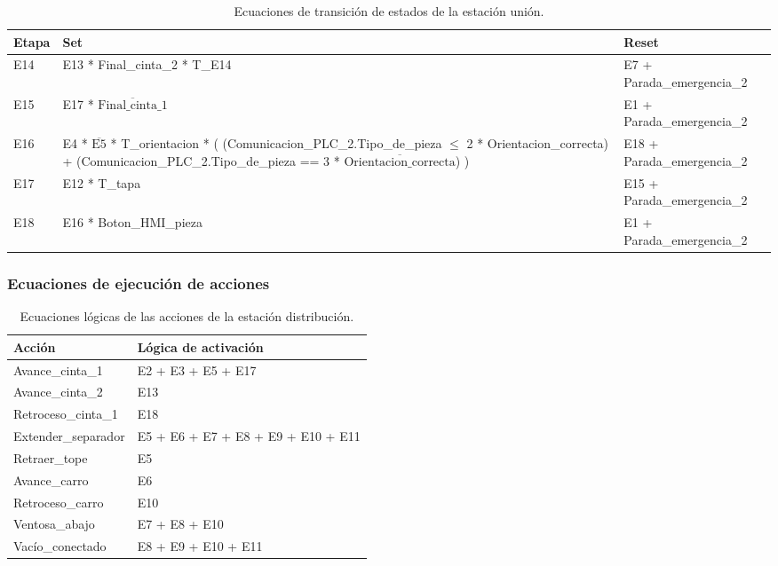 \begin{table}[H]
\begin{center}

\renewcommand{\arraystretch}{1.5}
\begin{tabular}{|M{1.5cm}|M{6cm}|M{6cm}|}
\hline
\textbf{Etapa} & 
\textbf{Set} & 
\textbf{Reset} \\
\hline
E14  &  E13 *  Final\_cinta\_2 * T\_E14 & E7 + Parada\_emergencia\_2 \\
\hline
E15  &  E17 * $\overline{\text{Final\_cinta\_1}}$ & E1 + Parada\_emergencia\_2 \\
\hline
E16  &  E4 * $\overline{\text{E5}}$ * T\_orientacion * ( (Comunicacion\_PLC\_2.Tipo\_de\_pieza $\leq$ 2 * Orientacion\_correcta) + (Comunicacion\_PLC\_2.Tipo\_de\_pieza == 3 * $\overline{\text{Orientacion\_correcta}}$) ) & E18 + Parada\_emergencia\_2 \\
\hline
E17  &  E12 * T\_tapa & E15 + Parada\_emergencia\_2 \\
\hline
E18  &  E16 *  Boton\_HMI\_pieza & E1 + Parada\_emergencia\_2 \\
\hline

\end{tabular}

\caption{Ecuaciones de transición de estados de la estación unión.}
\label{cuadro:transiciones_union_2}
\end{center}
\end{table}

\subsubsection{Ecuaciones de ejecución de acciones}

\begin{table}[H]
\begin{center}

\renewcommand{\arraystretch}{1.5}
\begin{tabular}{|M{5cm}|M{8.5cm}|}
\hline
\textbf{Acción} & 
\textbf{Lógica de activación} \\ 
\hline
Avance\_cinta\_1 &  E2 + E3 + E5 + E17 \\
\hline
Avance\_cinta\_2 &  E13 \\
\hline
Retroceso\_cinta\_1 & E18 \\
\hline
Extender\_separador &  E5 + E6 + E7 + E8 + E9 + E10 + E11 \\
\hline
Retraer\_tope &  E5 \\
\hline
Avance\_carro &  E6 \\
\hline
Retroceso\_carro &  E10 \\
\hline
Ventosa\_abajo &  E7 + E8 + E10 \\
\hline
Vacío\_conectado & E8 + E9 + E10 + E11 \\
\hline


\end{tabular}

\caption{Ecuaciones lógicas de las acciones de la estación distribución.}
\label{cuadro:acciones_distribucion}
\end{center}
\end{table}


